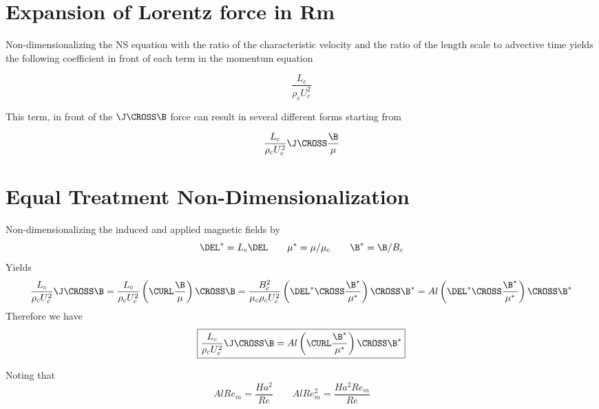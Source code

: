 \documentclass[landscape,11pt]{article}
\begin{document}
\doublespacing
\MOONSTITLE

\section{Expansion of Lorentz force in Rm}
Non-dimensionalizing the NS equation with the ratio of the characteristic velocity and the ratio of the length scale to advective time yields the following coefficient in front of each term in the momentum equation

\begin{equation}
	\frac{L_c}{\rho_c U_c^2}
\end{equation}

This term, in front of the $\J \CROSS \B$ force can result in several different forms starting from

\begin{equation}
	 \frac{L_c}{\rho_c U_c^2} \J \CROSS \frac{\B}{\mu}
\end{equation}

\section{Equal Treatment Non-Dimensionalization}
Non-dimensionalizing the induced and applied magnetic fields by
\begin{equation}
	\DEL^* = L_c \DEL \qquad
	\mu^* = \mu / \mu_c \qquad
	\B^* = \B/B_c
\end{equation}
Yields
\begin{equation}
	 \frac{L_c}{\rho_c U_c^2} \J \CROSS \B
	 =
	 \frac{L_c}{\rho_c U_c^2} \left( \CURL \frac{\B}{\mu} \right) \CROSS \B
	 =
	\frac{B_c^2}{\mu_c \rho_c U_c^2} \left( \DEL^* \CROSS \frac{\B^*}{\mu^*} \right) \CROSS \B^*
	 =
	Al \left( \DEL^* \CROSS \frac{\B^*}{\mu^*} \right) \CROSS \B^*
\end{equation}
Therefore we have
\begin{equation}
	\boxed{
	 \frac{L_c}{\rho_c U_c^2} \J \CROSS \B
	 =
	Al \left( \CURL \frac{\B^*}{\mu^*} \right) \CROSS \B^*
	}
\end{equation}

Noting that
\begin{equation}
	Al Re_m = \frac{Ha^2}{Re} \qquad
	Al Re_m^2 = \frac{Ha^2 Re_m}{Re} \qquad
\end{equation}
\end{document}
